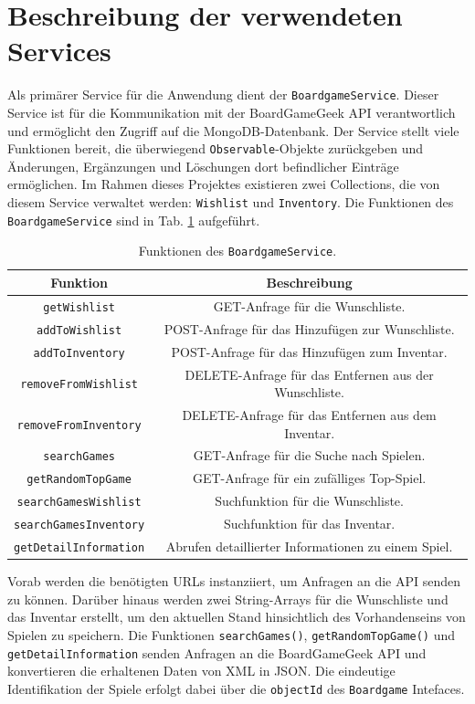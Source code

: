 \section{Beschreibung der verwendeten Services}
Als primärer Service für die Anwendung dient der \texttt{BoardgameService}. Dieser Service ist für die
Kommunikation mit der BoardGameGeek \ac{API} verantwortlich und ermöglicht den Zugriff auf die
MongoDB-Datenbank. Der Service stellt viele Funktionen bereit, die überwiegend
\texttt{Observable}-Objekte zurückgeben und Änderungen, Ergänzungen und Löschungen dort befindlicher Einträge
ermöglichen. Im Rahmen dieses Projektes existieren zwei Collections, die von diesem Service
verwaltet werden: \texttt{Wishlist} und \texttt{Inventory}. Die Funktionen des \texttt{BoardgameService} sind in Tab. \ref{tab:boardgame_service} aufgeführt.
\begin{table}[H]
    \centering
    \begin{tabular}{|c|c|}
        \hline
        \textbf{Funktion} & \textbf{Beschreibung} \\
        \hline
        \texttt{getWishlist} & GET-Anfrage für die Wunschliste. \\
        \texttt{addToWishlist} & POST-Anfrage für das Hinzufügen zur Wunschliste. \\
        \texttt{addToInventory} & POST-Anfrage für das Hinzufügen zum Inventar. \\
        \texttt{removeFromWishlist} & DELETE-Anfrage für das Entfernen aus der Wunschliste. \\
        \texttt{removeFromInventory} & DELETE-Anfrage für das Entfernen aus dem Inventar. \\
        \texttt{searchGames} & GET-Anfrage für die Suche nach Spielen. \\
        \texttt{getRandomTopGame} & GET-Anfrage für ein zufälliges Top-Spiel. \\
        \texttt{searchGamesWishlist} & Suchfunktion für die Wunschliste. \\
        \texttt{searchGamesInventory} & Suchfunktion für das Inventar. \\
        \texttt{getDetailInformation} & Abrufen detaillierter Informationen zu einem Spiel. \\
        \hline
    \end{tabular}
    \caption{Funktionen des \texttt{BoardgameService}.}
    \label{tab:boardgame_service}
\end{table}
Vorab werden die benötigten URLs instanziiert, um Anfragen an die API senden zu können.
Darüber hinaus werden zwei String-Arrays für die Wunschliste und das Inventar erstellt, um den aktuellen Stand
hinsichtlich des Vorhandenseins von Spielen zu speichern. Die Funktionen \texttt{searchGames()},
\texttt{getRandomTopGame()} und \texttt{getDetailInformation} senden Anfragen an die BoardGameGeek \ac{API} und konvertieren die erhaltenen Daten
von XML in JSON. Die eindeutige Identifikation der Spiele erfolgt dabei über die \texttt{objectId} des
\texttt{Boardgame} Intefaces.
